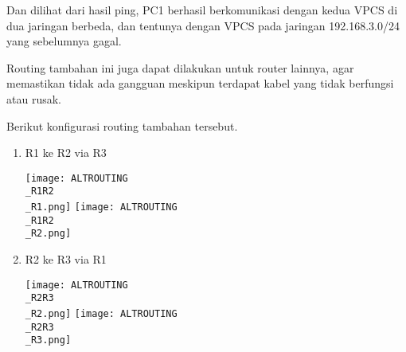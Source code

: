 \documentclass[12pt, a4paper]{article}
\begin{document}
  Dan dilihat dari hasil ping, PC1 berhasil berkomunikasi dengan
  kedua VPCS di dua jaringan berbeda, dan tentunya dengan VPCS pada
  jaringan 192.168.3.0/24 yang sebelumnya gagal.

  Routing tambahan ini juga dapat dilakukan untuk router lainnya,
  agar memastikan tidak ada gangguan meskipun terdapat kabel yang tidak
  berfungsi atau rusak.

  Berikut konfigurasi routing tambahan tersebut.

  \begin{enumerate}

    \item R1 ke R2 via R3
      \begin{center}
        \texttt{[image: ALTROUTING\\\_R1R2\\\_R1.png]}
        \texttt{[image: ALTROUTING\\\_R1R2\\\_R2.png]}
      \end{center}

    \item R2 ke R3 via R1
      \begin{center}
        \texttt{[image: ALTROUTING\\\_R2R3\\\_R2.png]}
        \texttt{[image: ALTROUTING\\\_R2R3\\\_R3.png]}
      \end{center}

  \end{enumerate}
\end{document}
